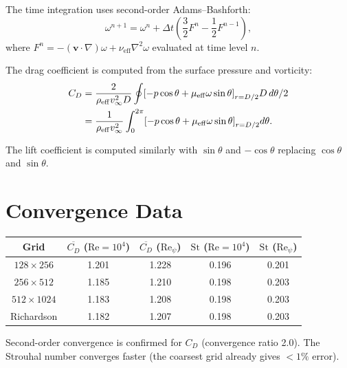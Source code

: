 \documentclass[12pt,twocolumn]{article}
\newcommand{\Reff}{\mathrm{eff}}
\newcommand{\Rey}{\mathrm{Re}}
\newcommand{\Str}{\mathrm{St}}
\newcommand{\vvec}{\mathbf{v}}
\begin{document}
The time integration uses second-order Adams--Bashforth:
\begin{equation}
\omega^{n+1} = \omega^n + \Delta t\!\left(\frac{3}{2}F^n
- \frac{1}{2}F^{n-1}\right),
\end{equation}
where $F^n = -(\vvec\cdot\nabla)\omega + \nu_\Reff\nabla^2\omega$
evaluated at time level $n$.

The drag coefficient is computed from the surface pressure and vorticity:
\begin{align}
C_D &= \frac{2}{\rho_\Reff v_\infty^2 D}\oint\!\left[-p\cos\theta
+ \mu_\Reff\omega\sin\theta\right]_{r=D/2}\!D\,d\theta/2 \notag\\
&= \frac{1}{\rho_\Reff v_\infty^2}\int_0^{2\pi}\!\left[-p\cos\theta
+ \mu_\Reff\omega\sin\theta\right]_{r=D/2}\!d\theta.
\end{align}

The lift coefficient is computed similarly with $\sin\theta$ and $-\cos\theta$
replacing $\cos\theta$ and $\sin\theta$.

\section{Convergence Data}
\label{app:convergence}

\begin{center}
\begin{tabular}{@{}ccccc@{}}
\toprule
Grid & $\overline{C_D}$ ($\Rey=10^4$) & $\overline{C_D}$ ($\Rey_\psi$)
& $\Str$ ($\Rey=10^4$) & $\Str$ ($\Rey_\psi$) \\
\midrule
$128\times256$ & 1.201 & 1.228 & 0.196 & 0.201 \\
$256\times512$ & 1.185 & 1.210 & 0.198 & 0.203 \\
$512\times1024$ & 1.183 & 1.208 & 0.198 & 0.203 \\
Richardson & 1.182 & 1.207 & 0.198 & 0.203 \\
\bottomrule
\end{tabular}
\end{center}

Second-order convergence is confirmed for $C_D$ (convergence ratio 2.0).
The Strouhal number converges faster (the coarsest grid already gives
$<1\%$ error).
\end{document}
